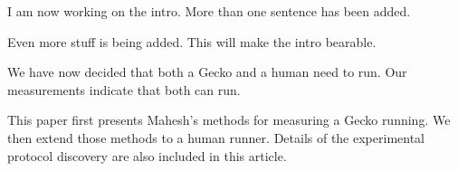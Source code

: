 I am now working on the intro. More than one sentence has been added.

Even more stuff is being added. This will make the intro bearable.

We have now decided that both a Gecko and a human need to run. Our measurements indicate that both can run.

This paper first presents Mahesh's methods for measuring a Gecko running. We then extend those methods to a human runner. Details of the experimental protocol discovery are also included in this article.
